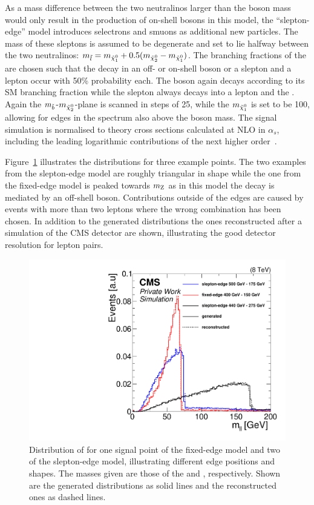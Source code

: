 As a mass difference between the two neutralinos larger than the \Z boson mass would only result in the production of on-shell \Z bosons in this model, the ``slepton-edge'' model introduces selectrons and smuons as additional new particles. The mass of these sleptons is assumed to be degenerate and set to lie halfway between the two neutralinos: $m_{\tilde{l}} = m_{{\tilde{\chi}^0_1}} + 0.5(m_{{\tilde{\chi}^0_2}}-m_{{\tilde{\chi}^0_1}})$. The branching fractions of the \secondchi are chosen such that the decay in an off- or on-shell \Z boson or a slepton and a lepton occur with 50\% probability each. The \Z boson again decays according to its SM branching fraction while the slepton always decays into a lepton and the \firstchi. Again the $m_{\tilde{b}}$-$m_{{\tilde{\chi}^0_2}}$-plane is scanned in steps of 25\GeV, while the $m_{{\tilde{\chi}^0_1}}$ is set to be 100\GeV, allowing for edges in the \mll spectrum also above the \Z boson mass. 
The signal simulation is normalised to theory cross sections calculated at NLO in $\alpha_s$, including the leading logarithmic contributions of the next higher order~\cite{bib-nlo-nll-01,bib-nlo-nll-02,bib-nlo-nll-03,bib-nlo-nll-04,bib-nlo-nll-05,ref:xsec}.

Figure~\ref{fig:SUSYMasses} illustrates the \mll distributions for three example points. The two examples from the slepton-edge model are roughly triangular in shape while the one from the fixed-edge model is peaked towards $m_{\mathrm{Z}}$ as in this model the decay is mediated by an off-shell \Z boson. Contributions outside of the edges are caused by events with more than two leptons where the wrong combination has been chosen. In addition to the generated distributions the ones reconstructed after a simulation of the CMS detector are shown, illustrating the good detector resolution for lepton pairs.
\begin{figure}
\centering
\includegraphics[scale=0.3]{plots/THEO/SUSY_masses.pdf}
\caption{Distribution of \mll for one signal point of the fixed-edge model and two of the slepton-edge model, illustrating different edge positions and shapes. The masses given are those of the \sbottom and \secondchi, respectively. Shown are the generated distributions as solid lines and the reconstructed ones as dashed lines.}
\label{fig:SUSYMasses}
\end{figure}

